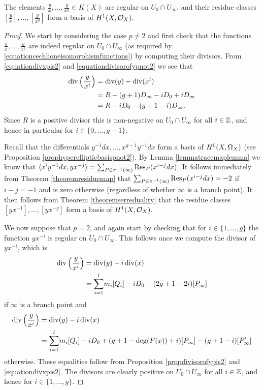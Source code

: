     \begin{thm}\label{theorembasisofhone}
    The elements $\frac{y}{x}, \ldots, \frac{y}{x^g} \in K(X)$ are regular on $U_0 \cap U_\infty$, and their residue classes $\left [ \frac{y}{x} \right ],  \ldots, \left [ \frac{y}{x^g} \right]$ form a basis of $H^1(X,\mathcal{O}_X)$.
    \end{thm}
    \begin{proof}
    We start by considering the case $p \neq 2$ and first check that the functions $\frac{y}{x}, \ldots, \frac{y}{x^g}$ are indeed regular on $U_0 \cap U_\infty$ (as required by \eqref{equationcechhoneisomorphismfunctions}) by computing their divisors.
    From \eqref{equationdivxpis2} and \eqref{equationdivisorofypnot2} we see that
        \begin{equation*}\label{equationdivisorofyoverx}
        \begin{split}
        \operatorname{div} \left( \frac{y}{x^i} \right) & = \operatorname{div} (y) - \operatorname{div} ( x^i) \\
        & = R - (g+1)D_\infty - iD_0 + iD_\infty \\
        & = R - iD_0 - (g+1 - i)D_\infty.
        \end{split}
        \end{equation*}
    Since $R$ is a positive divisor this is non-negative on $U_0 \cap U_\infty$ for all $i \in {\mathbb Z}$, and hence in particular for $i\in \{0, \ldots, g-1\}$.
    
    
    Recall that the differentials $ y^{-1}dx, \ldots,  x^{g-1}y^{-1}dx$ form a basis of ${H^0(X,\Omega_X)}$ (see Proposition \ref{prophyperellipticbasispnot2}).
    By Lemma \ref{lemmatracemaplemma} we know that $\langle x^iy^{-1}dx, yx^{-j} \rangle = \sum_{P \in \pi^{-1}(\infty)}\operatorname{Res}_P(x^{i-j}dx)$.
    It follows immediately from Theorem \ref{theoremresiduemap} that $\sum_{P \in \pi^{-1}(\infty)}\operatorname{Res}_P(x^{i-j}dx) = -2$ if $i-j=-1$ and is zero otherwise (regardless of whether $\infty$ is a branch point).
    It then follows from Theorem \ref{theoremserreduality} that the residue classes $\left[yx^{-1}\right],\ldots,\left[yx^{-g}\right]$ form a basis of $H^1(X,\mathcal{O}_X)$.
    
    We now suppose that $p=2$, and again start by checking that for $i \in \{1, \ldots , g\}$ the function $yx^{-i}$ is regular on $U_0 \cap U_\infty$.
    This follows once we compute the divisor of $yx^{-i}$, which is
        \begin{align*}
        \operatorname{div} \left( \frac{y}{x^i} \right)  & =  \operatorname{div}(y) - i\operatorname{div}(x) \\
        & = {\displaystyle \sum_{i=1}^l} m_i[Q_i] -iD_0 -(2g+1 - 2i)[P_\infty]
        \end{align*}
    if $\infty$ is a branch point and
        \begin{align*}
        \operatorname{div} \left( \frac{y}{x^i} \right)  & =  \operatorname{div}(y) - i\operatorname{div}(x) \\  
        & = {\displaystyle \sum_{i=1}^l} m_i[Q_i] - iD_0 +(g+1-\deg(F(x)) + i)[P_\infty] - (g+1-i)[P_\infty']
        \end{align*}
    otherwise.
    These equalities follow from Proposition \ref{propdivisorofypis2} and \eqref{equationdivxpis2}.
    The divisors are clearly positive on $U_0 \cap U_\infty$ for all $i \in {\mathbb Z}$, and hence for $ i \in \{1, \ldots, g \}$.
    

\end{proof}
